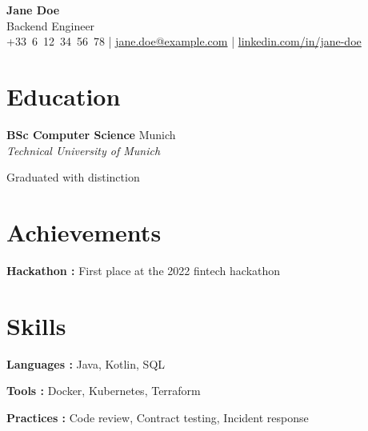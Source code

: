 \documentclass[10pt]{extarticle}
\newcommand{\edu}[3]{%
  \textbf{#1} \hfill {\color{soft}\small #3}\\[-1pt]
  {\itshape\small #2}\par
}
\begin{document}
\begin{center}
    {\fontsize{18}{18}\selectfont\bfseries\color{accent} Jane Doe}\\[3pt]
    {\normalsize\color{soft} Backend Engineer}\\[4pt]
    {\footnotesize
      +33~6~12~34~56~78 \quad|\quad
      \href{mailto:jane.doe@example.com}{jane.doe@example.com} \quad|\quad
      \href{https://www.linkedin.com/in/jane-doe}{linkedin.com/in/jane-doe}
    }
\end{center}
\vspace{-9pt}

\noindent\begin{minipage}[t]{0.27\textwidth}
\section{Education}

\edu{BSc Computer Science}{Technical University of Munich}{Munich}

{\footnotesize Graduated with distinction}

\section{Achievements}

\begin{tightlist}
\item \textbf{Hackathon :} First place at the 2022 fintech hackathon
\end{tightlist}

\section{Skills}

\begin{tightlist}
    \item[] \textbf{Languages :} Java, Kotlin, SQL

    \item[] \textbf{Tools :} Docker, Kubernetes, Terraform

    \item[] \textbf{Practices :} Code review, Contract testing, Incident response

\end{tightlist}
\end{minipage}\hfill
\end{document}
